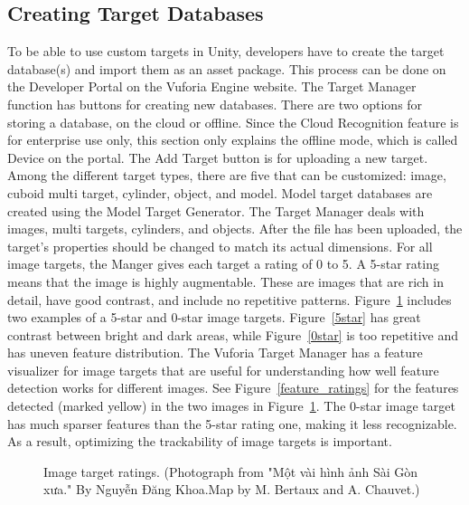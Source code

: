 \subsection{Creating Target Databases}
To be able to use custom targets in Unity, developers have to create the target database(s) and import them as an asset package. This process can be done on the Developer Portal on the Vuforia Engine website. The Target Manager function has buttons for creating new databases. There are two options for storing a database, on the cloud or offline. Since the Cloud Recognition feature is for enterprise use only, this section only explains the offline mode, which is called Device on the portal. The Add Target button is for uploading a new target. Among the different target types, there are five that can be customized: image, cuboid multi target, cylinder, object, and model. Model target databases are created using the Model Target Generator. The Target Manager deals with images, multi targets, cylinders, and objects. After the file has been uploaded, the target's properties should be changed to match its actual dimensions. For all image targets, the Manger gives each target a rating of 0 to 5. A 5-star rating means that the image is highly augmentable. These are images that are rich in detail, have good contrast, and include no repetitive patterns. Figure~\ref{ratings} includes two examples of a 5-star and 0-star image targets. Figure~\ref{5star} has great contrast between bright and dark areas, while Figure~\ref{0star} is too repetitive and has uneven feature distribution. The Vuforia Target Manager has a feature visualizer for image targets that are useful for understanding how well feature detection works for different images. See Figure~\ref{feature_ratings} for the features detected (marked yellow) in the two images in Figure~\ref{ratings}. The 0-star image target has much sparser features than the 5-star rating one, making it less recognizable. As a result, optimizing the trackability of image targets is important.

\begin{figure}[!ht]\centering
{}
\qquad
{}
\vspace{-.2 in}
\caption[Image target ratings]{Image target ratings. (\vi Photograph from "Một vài hình ảnh Sài Gòn xưa." By Nguyễn Đăng Khoa.\footnotemark Map by M. Bertaux and A. Chauvet.\footnotemark)}\label{ratings}
\end{figure}

